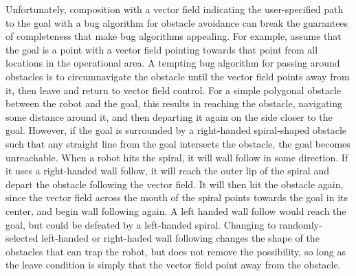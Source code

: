 Unfortunately, composition with a vector field indicating the user-specified path to the goal with a bug algorithm for obstacle avoidance can break the guarantees of completeness that make bug algorithms appealing. 
For example, assume that the goal is a point with a vector field pointing towards that point from all locations in the operational area. 
A tempting bug algorithm for passing around obstacles is to circumnavigate the obstacle until the vector field points away from it, then leave and return to vector field control. 
For a simple polygonal obstacle between the robot and the goal, this results in reaching the obstacle, navigating some distance around it, and then departing it again on the side closer to the goal. 
However, if the goal is surrounded by a right-handed spiral-shaped obstacle such that any straight line from the goal intersects the obstacle, the goal becomes unreachable. 
When a robot hits the spiral, it will wall follow in some direction.
If it uses a right-handed wall follow, it will reach the outer lip of the spiral and depart the obstacle following the vector field. It will then hit the obstacle again, since the vector field across the mouth of the spiral points towards the goal in its center, and begin wall following again. 
A left handed wall follow would reach the goal, but could be defeated by a left-handed spiral. 
Changing to randomly-selected left-handed or right-haded wall following changes the shape of the obstacles that can trap the robot, but does not remove the possibility, so long as the leave condition is simply that the vector field point away from the obstacle. 

